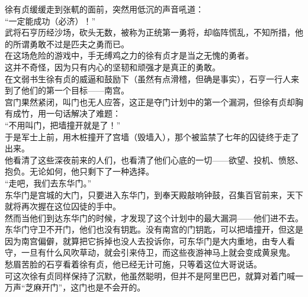 \begin{multicols}{\theparacolNo}
徐有贞缓缓走到张軏的面前，突然用低沉的声音吼道：\\

“一定能成功（必济）！”\\

武将石亨历经沙场，砍头无数，被称为正统第一勇将，却临阵慌乱，不知所措，他的所谓勇敢不过是匹夫之勇而已。\\

在这场危险的游戏中，手无缚鸡之力的徐有贞才是当之无愧的勇者。\\

这并不奇怪，因为只有内心的坚韧和顽强才是真正的勇敢。\\

在文弱书生徐有贞的威逼和鼓励下（虽然有点滑稽，但确是事实），石亨一行人来到了他们的第一个目标——南宫。\\

宫门果然紧闭，叫门也无人应答，这正是夺门计划中的第一个漏洞，但徐有贞却胸有成竹，用一句话解决了难题：\\

“不用叫门，把墙撞开就是了！”\\

于是军士上前，用木桩撞开了宫墙（毁墙入），那个被监禁了七年的囚徒终于走了出来。\\

他看清了这些深夜前来的人们，也看清了他们心底的一切——欲望、投机、愤怒、抱负。无论如何，他只剩下了一种选择。\\

“走吧，我们去东华门。”\\

东华门是宫城的大门，只要进入东华门，到奉天殿敲响钟鼓，召集百官前来，天下就将再次握在这位囚徒的手中。\\

然而当他们到达东华门的时候，才发现了这个计划中的最大漏洞——他们进不去。\\

东华门守卫不开门，他们也没有钥匙。没有南宫的门钥匙，可以把墙撞开，但这是因为南宫偏僻，就算把它拆掉也没人去投诉你，可东华门是大内重地，由专人看守，一旦有什么风吹草动，就会引来侍卫，而这些夜游神马上就会变成黄泉鬼。\\

愁眉苦脸的石亨看着徐有贞，他已经无计可施，只等着这位大哥说话。\\

可这次徐有贞同样保持了沉默，他虽然聪明，但并不是阿里巴巴，就算对着门喊一万声“芝麻开门”，这门也是不会开的。\\


\end{multicols}
